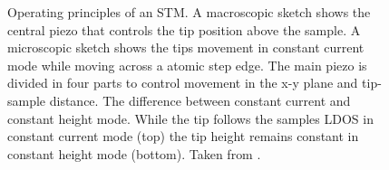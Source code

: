 \begin{figure}\centering
	\caption{Operating principles of an STM.  A macroscopic sketch  shows the central piezo that controls the tip position above the sample. A microscopic sketch shows the tips movement in constant current mode while moving across a atomic step edge. The main piezo is divided in four parts to control movement in the x-y plane and tip-sample distance\cite{STM-rutgers}.  The difference between constant current and constant height mode. While the tip follows the samples LDOS in constant current mode (top) the tip height remains constant in constant height mode (bottom). Taken from \cite{diss-manuela}.}
	\label{fig:STM-sketch}
\end{figure}


